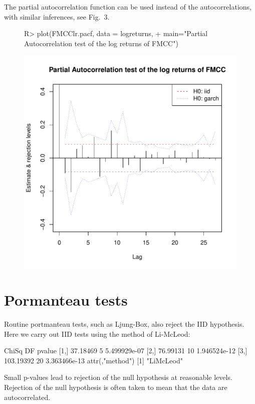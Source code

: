 \documentclass[article,nojss]{jss}
\begin{document}
The partial autocorrelation function can be used instead of the autocorrelations, with
similar inferences, see Fig.~3.
\begin{figure}
  \centering
\begin{Schunk}
\begin{Sinput}
R> plot(FMCClr.pacf, data = logreturns,
+ main="Partial Autocorrelation test of the log returns of FMCC")
\end{Sinput}
\end{Schunk}
\includegraphics{garch_tests_example-007}
\end{figure}


\section{Pormanteau tests}
\label{sec:white-noise-tests}


Routine portmanteau tests, such as Ljung-Box, also reject the IID hypothesis.
Here we carry out IID tests using the method of Li-McLeod:
\begin{Schunk}
\begin{Soutput}
         ChiSq DF       pvalue
[1,]  37.18469  5 5.499929e-07
[2,]  76.99131 10 1.946524e-12
[3,] 103.19392 20 3.363466e-13
attr(,"method")
[1] "LiMcLeod"
\end{Soutput}
\end{Schunk}
Small p-values lead to rejection of the null hypothesis at reasonable levels.
Rejection of the null hypothesis is often taken to mean that the data are autocorrelated.
\end{document}
